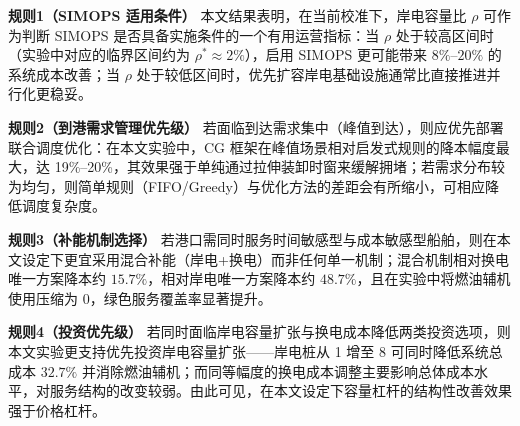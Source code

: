 \documentclass[UTF8, a4paper, 12pt]{ctexart}
\theoremstyle{plain}
\theoremstyle{definition}
\theoremstyle{remark}
\begin{document}
\textbf{规则1（SIMOPS 适用条件）}
本文结果表明，在当前校准下，岸电容量比 $\rho$ 可作为判断 SIMOPS 是否具备实施条件的一个有用运营指标：当 $\rho$ 处于较高区间时（实验中对应的临界区间约为 $\rho^*\approx 2\%$），启用 SIMOPS 更可能带来 $8\%$--$20\%$ 的系统成本改善；当 $\rho$ 处于较低区间时，优先扩容岸电基础设施通常比直接推进并行化更稳妥。

\textbf{规则2（到港需求管理优先级）}
若面临到达需求集中（峰值到达），则应优先部署联合调度优化：在本文实验中，CG 框架在峰值场景相对启发式规则的降本幅度最大，达 19\%--20\%，其效果强于单纯通过拉伸装卸时窗来缓解拥堵；若需求分布较为均匀，则简单规则（FIFO/Greedy）与优化方法的差距会有所缩小，可相应降低调度复杂度。

\textbf{规则3（补能机制选择）}
若港口需同时服务时间敏感型与成本敏感型船舶，则在本文设定下更宜采用混合补能（岸电+换电）而非任何单一机制；混合机制相对换电唯一方案降本约 $15.7\%$，相对岸电唯一方案降本约 $48.7\%$，且在实验中将燃油辅机使用压缩为 0，绿色服务覆盖率显著提升。

\textbf{规则4（投资优先级）}
若同时面临岸电容量扩张与换电成本降低两类投资选项，则本文实验更支持优先投资岸电容量扩张——岸电桩从 1 增至 8 可同时降低系统总成本 $32.7\%$ 并消除燃油辅机；而同等幅度的换电成本调整主要影响总体成本水平，对服务结构的改变较弱。由此可见，在本文设定下容量杠杆的结构性改善效果强于价格杠杆。

\begin{table}[htbp]
\centering
\caption{管理启示总结}
\label{tab:mgmt_rules}
\scriptsize
\setlength{\tabcolsep}{4pt}
\renewcommand{\arraystretch}{1.05}
\end{table}
\end{document}
